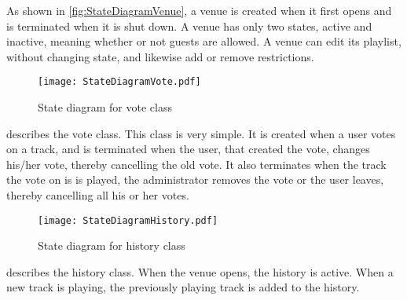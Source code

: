 As shown in \cref{fig:StateDiagramVenue}, a venue is created when it first opens and is terminated when it is shut down. A venue has only two states, active and inactive, meaning whether or not guests are allowed. A venue can edit its playlist, without changing state, and likewise add or remove restrictions.

\begin{figure}[H]
  \centering
  \texttt{[image: StateDiagramVote.pdf]}
  \caption{State diagram for vote class}\label{fig:StateDiagramVote}
\end{figure}

 describes the vote class. This class is very simple. It is created when a user votes on a track, and is terminated when the user, that created the vote, changes his/her vote, thereby cancelling the old vote. It also terminates when the track the vote on is is played, the administrator removes the vote or the user leaves, thereby cancelling all his or her votes.

\begin{figure}[H]
  \centering
  \texttt{[image: StateDiagramHistory.pdf]}
  \caption{State diagram for history class}\label{fig:StateDiagramHistory}
\end{figure}

 describes the history class. When the venue opens, the history is active. When a new track is playing, the previously playing track is added to the history.
